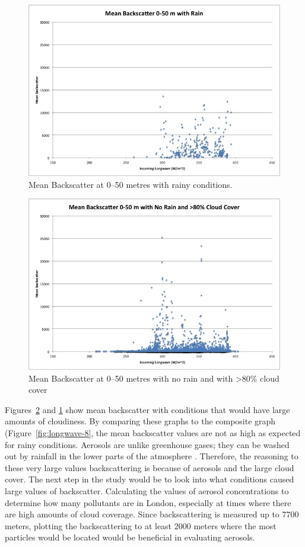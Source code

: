 \documentclass[a4paper,titlepage, twoside]{report}
\begin{document}
\begin{figure}
\includegraphics[width=\textwidth]{13.jpg}
\caption{Mean Backscatter at 0--50 metres with rainy conditions.}
\label{fig:longwave-13}
\end{figure}

\begin{figure}
\includegraphics[width=\textwidth]{12.jpg}
\caption{Mean Backscatter at 0--50 metres with no rain and with >80\% cloud cover}
\label{fig:longwave-12}
\end{figure}

Figures~\ref{fig:longwave-12} and \ref{fig:longwave-13} show mean backscatter with conditions that would have large amounts of cloudiness.  By comparing these graphs to the composite graph (Figure~\ref{fig:longwave-8}, the mean backscatter values are not as high as expected for rainy conditions.  Aerosols are unlike greenhouse gases; they can be washed out by rainfall in the lower parts of the atmosphere \parencite{rmets}.  Therefore, the reasoning to these very large values backscattering is because of aerosols and the large cloud cover.
The next step in the study would be to look into what conditions caused large values of backscatter.  Calculating the values of aerosol concentrations to determine how many pollutants are in London, especially at times where there are high amounts of cloud coverage. Since backscattering is measured up to 7700 meters, plotting the backscattering to at least 2000 meters where the most particles would be located would be beneficial in evaluating aerosols.
\end{document}
